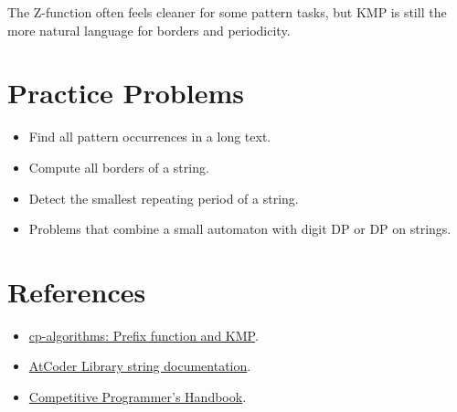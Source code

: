 The Z-function often feels cleaner for some pattern tasks, but KMP is still the more natural language for borders and
periodicity.

\section*{Practice Problems}

\begin{itemize}
  \item Find all pattern occurrences in a long text.
  \item Compute all borders of a string.
  \item Detect the smallest repeating period of a string.
  \item Problems that combine a small automaton with digit DP or DP on strings.
\end{itemize}

\section*{References}

\begin{itemize}
  \item \href{https://cp-algorithms.com/string/prefix-function.html}{cp-algorithms: Prefix function and KMP}.
  \item \href{https://atcoder.github.io/ac-library/production/document_en/string.html}{AtCoder Library string documentation}.
  \item \href{https://usaco.guide/CPH.pdf}{Competitive Programmer's Handbook}.
\end{itemize}
